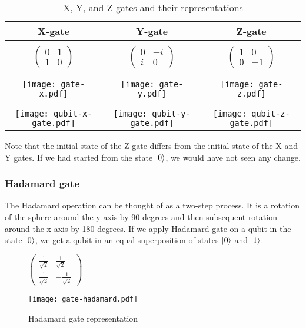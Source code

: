 \begin{table}[H]
  \centering
  \begin{tabular}{|c|c|c|} 
      \hline
      \textbf{X-gate} & \textbf{Y-gate} & \textbf{Z-gate}\\
      \hline
      &&\\[0.5pt]
      $\begin{pmatrix}
        0 & 1 \\
        1 & 0
      \end{pmatrix}$ & 
      $\begin{pmatrix}
        0 & -i \\
        i & 0
      \end{pmatrix}$ &
      $\begin{pmatrix}
        1 & 0 \\
        0 & -1
      \end{pmatrix}$\\
      &&\\[0.5pt]
      \hline
      &&\\[0.5pt]
      \texttt{[image: gate-x.pdf]} & \texttt{[image: gate-y.pdf]}  & \texttt{[image: gate-z.pdf]}\\
      &&\\[0.5pt]
      \hline
      &&\\[0.5pt]
      \texttt{[image: qubit-x-gate.pdf]} & \texttt{[image: qubit-y-gate.pdf]} & \texttt{[image: qubit-z-gate.pdf]}\\
      \hline
  \end{tabular}
  \caption{X, Y, and Z gates and their representations}
  \label{tab:xyz-gates}
\end{table}
Note that the initial state of the Z-gate differs from the initial state of the X and Y gates. If we had started from the state $\lvert0\rangle$, we would have not seen any change.

\subsubsection*{Hadamard gate}
The Hadamard operation can be thought of as a two-step process. It is a rotation of the sphere around the y-axis by 90 degrees and then subsequent rotation around the x-axis by 180 degrees. If we apply Hadamard gate on a qubit in the state $\lvert0\rangle$, we get a qubit in an equal superposition of states $\lvert0\rangle$ and $\lvert1\rangle$.
\begin{figure}[H]
    \centering
    \begin{minipage}{0.4\linewidth}
      \centering
      $\begin{pmatrix} 
        \frac{1}{\sqrt{2}} &  \frac{1}{\sqrt{2}}  \\
        \frac{1}{\sqrt{2}}  &  -\frac{1}{\sqrt{2}} 
        \end{pmatrix}$
    \end{minipage}
    \begin{minipage}{0.25\linewidth}
      \centering
      \texttt{[image: gate-hadamard.pdf]}
    \end{minipage}
    \caption{Hadamard gate representation}
\end{figure}

